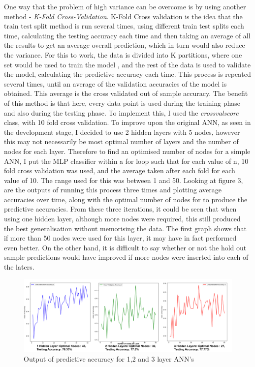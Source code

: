 \documentclass[11pt]{article}
\begin{document}
One way that the problem of high variance can be overcome is by using another method - \textit{K-Fold Cross-Validation}. K-Fold Cross validation is the idea that the train test split method is run several times, using different train test splits each time, calculating the testing accuracy each time and then taking an average of all the results to get an average overall prediction, which in turn would also reduce the variance. For this to work, the data is divided into K partitions, where one set would be used to train the model , and the rest of the data is used to validate the model, calculating the predictive accuracy each time. This process is repeated several times, until an average of the validation accuracies of the model is obtained. This average is the cross validated out of sample accuracy.  The benefit of this method is that here, every data point is used during the training phase and also during the testing phase. To implement this, I used the \textit{cross\textunderscore val\textunderscore score} class, with 10 fold cross validation. To improve upon the original ANN, as seen in the development stage, I decided to use 2 hidden layers with 5 nodes, however this may not necessarily be most optimal number of layers and the number of nodes for each layer. Therefore to find an optimised number of nodes for a simple ANN, I put the MLP classifier within a for loop such that for each value of n, 10 fold cross validation was used, and the average taken after each fold for each value of 10. The range used for this was between 1 and 50. Looking at figure 3, are the outputs of running this process three times and plotting average accuracies over time, along with the optimal number of nodes for to produce the predictive accuracies. From these three iterations, it could be seen that when using one hidden layer, although more nodes were required, this still produced the best generalisation without memorising the data. The first graph shows that if more than 50 nodes were used for this layer, it may have in fact performed even better. On the other hand, it is difficult to say whether or not the hold out sample predictions would have improved if more nodes were inserted into each of the laters. 
\begin{figure}[h]
\centering
\includegraphics[scale = .50]{graph}
\caption{Output of predictive accuracy for 1,2 and 3 layer ANN's} 
\end{figure}
\end{document}
